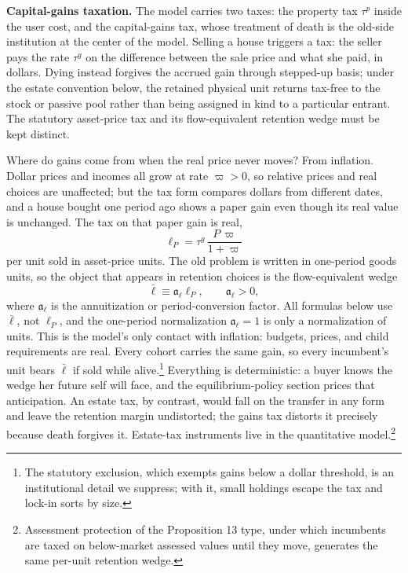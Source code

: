 \documentclass[11pt]{article}
\newcommand{\1}{\mathbf 1}
\begin{document}
\textbf{Capital-gains taxation.} The model carries two taxes: the property tax $\tau^p$ inside the user cost, and the capital-gains tax, whose treatment of death is the old-side institution at the center of the model. Selling a house triggers a tax: the seller pays the rate $\tau^g$ on the difference between the sale price and what she paid, in dollars. Dying instead forgives the accrued gain through stepped-up basis; under the estate convention below, the retained physical unit returns tax-free to the stock or passive pool rather than being assigned in kind to a particular entrant. The statutory asset-price tax and its flow-equivalent retention wedge must be kept distinct.

Where do gains come from when the real price never moves? From inflation. Dollar prices and incomes all grow at rate $\varpi>0$, so relative prices and real choices are unaffected; but the tax form compares dollars from different dates, and a house bought one period ago shows a paper gain even though its real value is unchanged. The tax on that paper gain is real,
\[
\ell_P=\tau^g\,\frac{P\,\varpi}{1+\varpi}
\]
per unit sold in asset-price units. The old problem is written in one-period goods units, so the object that appears in retention choices is the flow-equivalent wedge
\[
\bar\ell\equiv \mathfrak a_\ell \ell_P,
\qquad
\mathfrak a_\ell>0,
\]
where $\mathfrak a_\ell$ is the annuitization or period-conversion factor. All formulas below use $\bar\ell$, not $\ell_P$, and the one-period normalization $\mathfrak a_\ell=1$ is only a normalization of units. This is the model's only contact with inflation: budgets, prices, and child requirements are real. Every cohort carries the same gain, so every incumbent's unit bears $\bar\ell$ if sold while alive.\footnote{The statutory exclusion, which exempts gains below a dollar threshold, is an institutional detail we suppress; with it, small holdings escape the tax and lock-in sorts by size.} Everything is deterministic: a buyer knows the wedge her future self will face, and the equilibrium-policy section prices that anticipation. An estate tax, by contrast, would fall on the transfer in any form and leave the retention margin undistorted; the gains tax distorts it precisely because death forgives it. Estate-tax instruments live in the quantitative model.\footnote{Assessment protection of the Proposition 13 type, under which incumbents are taxed on below-market assessed values until they move, generates the same per-unit retention wedge.}
\end{document}
